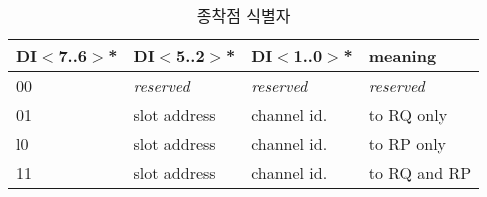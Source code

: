 %
%
\begin{table}[htbp]
\caption{종착점 식별자}
   \begin{center}
   \begin{tabular}{|l|l|l||l|} \hline
      DI$<$7..6$>$* & DI$<$5..2$>$* & DI$<$1..0$>$* & meaning \\ \hline \hline
      00 & {\it reserved\/} & {\it reserved\/} & {\it reserved\/} \\ \hline
      01 & slot address     & channel id.      & to RQ only \\ \hline
      l0 & slot address     & channel id.      & to RP only \\ \hline
      11 & slot address     & channel id.      & to RQ and RP \\ \hline
   \end{tabular}
   \end{center}
\end{table}
%
%
